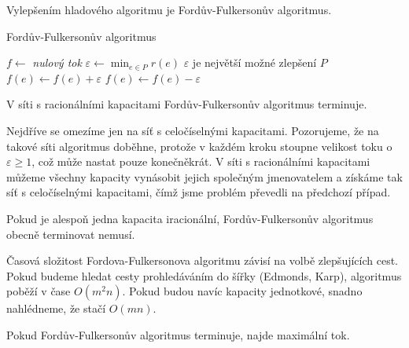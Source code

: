 \begin{t_definition}
  Vylepšením hladového algoritmu je Fordův-Fulkersonův algoritmus.
  
  \begin{algorithm}
    \caption{Fordův-Fulkersonův algoritmus}
    \begin{algorithmic}[1]
      \State $f\gets$ \textit{nulový tok}
      \State $\varepsilon\gets\min_{e\in P} r(e)$
      \Comment $\varepsilon$ je největší možné zlepšení $P$
          \State $f(e)\gets f(e)+\varepsilon$
        \Else
          \State $f(e)\gets f(e)-\varepsilon$
        \EndIf
      \EndFor
      \EndWhile
    \end{algorithmic}
  \end{algorithm}
\end{t_definition}

\begin{t_claim}
  V síti s racionálními kapacitami Fordův-Fulkersonův algoritmus terminuje.
\end{t_claim}

\begin{t_proof}
  Nejdříve se omezíme jen na síť s celočíselnými kapacitami. Pozorujeme, že na takové síti algoritmus doběhne, protože v každém kroku stoupne velikost toku o $\varepsilon\geq 1$, což může nastat pouze konečněkrát. V síti s racionálními kapacitami můžeme všechny kapacity vynásobit jejich společným jmenovatelem a získáme tak síť s celočíselnými kapacitami, čímž jsme problém převedli na předchozí případ. 
\end{t_proof}

\begin{t_remark}
  Pokud je alespoň jedna kapacita iracionální, Fordův-Fulkersonův algoritmus obecně terminovat nemusí.
\end{t_remark}

\begin{t_remark}
  Časová složitost Fordova-Fulkersonova algoritmu závisí na volbě zlepšujících cest. Pokud budeme hledat cesty prohledáváním do šířky (Edmonds, Karp), algoritmus poběží v čase $O(m^2n)$. Pokud budou navíc kapacity jednotkové, snadno nahlédneme, že stačí $O(mn)$.
\end{t_remark}

\begin{t_claim}
  Pokud Fordův-Fulkersonův algoritmus terminuje, najde maximální tok.
\end{t_claim}

